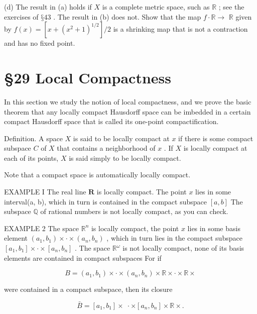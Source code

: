 (d) The result in (a) holds if \(X\) is a complete metric space, such as \(\mathbb{R}\) ; see the exercises of \(§{43}\) . The result in (b) does not. Show that the map \(f \cdot  \mathbb{R} \rightarrow\)  \(\mathbb{R}\) given by \(f\left( x\right)  = \left\lbrack  {x + {\left( {x}^{2} + 1\right) }^{1/2}}\right\rbrack  /2\) is a shrinking map that is not a contraction and has no fixed point.

\section*{§29 Local Compactness}

In this section we study the notion of local compactness, and we prove the basic theorem that any locally compact Hausdorff space can be imbedded in a certain compact Hausdorff space that is called its one-point compactification.

Definition. A space \(X\) is said to be locally compact at \(x\) if there is some compact subspace \(C\) of \(X\) that contains a neighborhood of \(x\) . If \(X\) is locally compact at each of its points, \(X\) is said simply to be locally compact.

Note that a compact space is automatically locally compact.

EXAMPLE I The real line \(\mathbf{R}\) is locally compact. The point \(x\) lies in some interval(a, b), which in turn is contained in the compact subspace \(\left\lbrack  {a,b}\right\rbrack\) The subspace \(\mathbb{Q}\) of rational numbers is not locally compact, as you can check.

EXAMPLE 2 The space \({\mathbb{R}}^{n}\) is locally compact, the point \(x\) lies in some basis element \(\left( {{a}_{1},{b}_{1}}\right)  \times   \cdot   \times  \left( {{a}_{n},{b}_{n}}\right)\) , which in turn lies in the compact subspace \(\left\lbrack  {{a}_{1},{b}_{1}}\right\rbrack   \times   \cdot   \times  \left\lbrack  {{a}_{n},{b}_{n}}\right\rbrack\) . The space \({\mathbb{R}}^{\omega }\) is not locally compact, none of its basis elements are contained in compact subspaces For if

\[
B = \left( {{a}_{1},{b}_{1}}\right)  \times   \cdot   \times  \left( {{a}_{n},{b}_{n}}\right)  \times  \mathbb{R} \times   \cdot   \times  \mathbb{R} \times
\]

were contained in a compact subspace, then its closure

\[
\bar{B} = \left\lbrack  {{a}_{1},{b}_{1}}\right\rbrack   \times  \; \cdot   \times  \left\lbrack  {{a}_{n},{b}_{n}}\right\rbrack   \times  \mathbb{R} \times  .
\]

